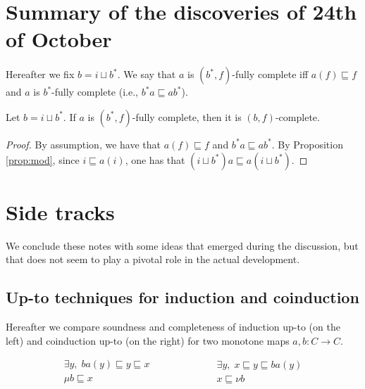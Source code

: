 \documentclass{llncs}
\begin{document}
\section{Summary of the discoveries of 24th of October}

Hereafter we fix $b=i \sqcup b^*$.
We say that $a$ is $(b^*,f)$-fully complete iff $a(f)\sqsubseteq f$ and $a$ is $b^*$-fully complete (i.e., $b^*a \sqsubseteq ab^*$).

\begin{proposition}
Let $b=i \sqcup b^*$. If $a$ is $(b^*,f)$-fully complete, then it is $(b,f)$-complete.
\end{proposition}
\begin{proof}
By assumption, we have that $a(f)\sqsubseteq f$ and $b^*a \sqsubseteq ab^*$. By Proposition \ref{prop:mod}, since $i\sqsubseteq a(i)$, one has that $(i\sqcup b^*)a \sqsubseteq a(i\sqcup b^*)$.

\end{proof}



\section{Side tracks}
We conclude these notes with some ideas that emerged during the discussion, but that does not seem to play a pivotal role in the actual development.


\subsection{Up-to techniques for induction and coinduction}

Hereafter we compare soundness and completeness of induction up-to (on the left) and coinduction up-to (on the right) for two monotone maps $a,b\colon C\to C$.

 \begin{equation}\label{eq:comparisonincoin}
 \begin{array}{c}
    \exists y, \;  ba(y) \sqsubseteq y\sqsubseteq x \\
    \hline %
    \mu b \sqsubseteq x
\end{array}
\qquad \qquad \qquad
 \begin{array}{c}
    \exists y, \; x \sqsubseteq y\sqsubseteq ba(y)\\
    \hline %
    x \sqsubseteq \nu b
\end{array}
\end{equation}
\end{document}
